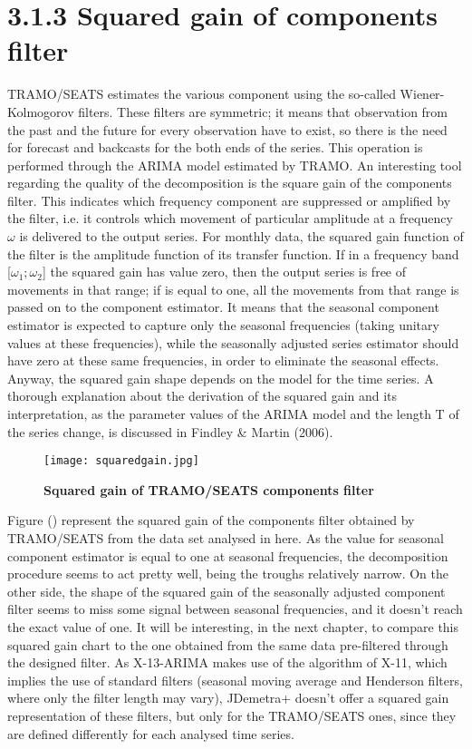 \documentclass{article}
\begin{document}
\section*{\small 3.1.3 Squared gain of components filter}
TRAMO/SEATS estimates the various component using the so-called Wiener-Kolmogorov filters. These filters are symmetric; it means that observation from the past and the future for every observation have to exist, so there is the need for forecast and backcasts for the both ends of the series. This operation is performed through the ARIMA model estimated by TRAMO.  An interesting tool regarding the quality of the decomposition is the square gain of the components filter. This indicates which frequency component are suppressed or amplified by the filter, i.e. it controls which movement of particular amplitude at a frequency $\omega$ is delivered to the output series. {\color{red}For monthly data, the squared gain function of the filter is the amplitude function of its transfer function.} If in a frequency band [$\omega_{1};\omega_{2}$] the squared gain has value zero, then the output series is free of movements in that range; if is equal to one, all the movements from that range is passed on to the component estimator. It means that the seasonal component estimator is expected to capture only the seasonal frequencies (taking unitary values at these frequencies), while the seasonally adjusted series estimator should have zero at these same frequencies, in order to eliminate the seasonal effects. {\color{red}Anyway, the squared gain shape depends on the model for the time series.} A thorough explanation about the derivation of the squared gain and its interpretation, as the parameter values of the ARIMA model and the length T of the series change, is discussed in Findley \& Martin (2006).
\begin{figure}[H]
  \texttt{[image: squaredgain.jpg]}
  \caption{\textbf{\footnotesize Squared gain of TRAMO/SEATS components filter}}
  \label{fig:1}
\end{figure}
Figure () represent the squared gain of the components filter obtained by TRAMO/SEATS from the data set analysed in here. As the value for seasonal component estimator is equal to one at seasonal frequencies, the decomposition procedure seems to act pretty well, being the troughs relatively narrow. On the other side, the shape of the squared gain of the seasonally adjusted component filter seems to miss some signal between seasonal frequencies, and it doesn't reach the exact value of one. It will be interesting, in the next chapter, to compare this squared gain chart to the one obtained from the same data pre-filtered through the designed filter.
As X-13-ARIMA makes use of the algorithm of X-11, which implies the use of standard filters (seasonal moving average and Henderson filters, where only the filter length may vary), JDemetra+ doesn't offer a squared gain representation of these filters, but only for the TRAMO/SEATS ones, since they are defined differently for each analysed time series.
\end{document}
